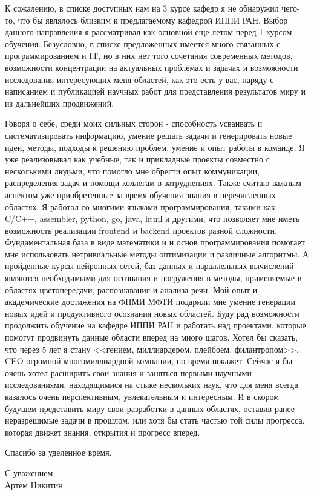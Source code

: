 \quad К сожалению, в списке доступных нам на 3 курсе кафедр я не обнаружил чего-то, что бы являлось близким к предлагаемому кафедрой ИППИ РАН.
Выбор данного направления я рассматривал как основной еще летом перед 1 курсом обучения. Безусловно, в списке предложенных имеется много
связанных с программированием и IT, но в них нет того сочетания современных методов, возможности концентрации на актуальных проблемах и задачах
и возможности исследования интересующих меня областей, как это есть у вас, наряду с написанием и публикацией научных работ для представления
результатов миру и из дальнейших продвижений.

\quad Говоря о себе, среди моих сильных сторон - способность усваивать и систематизировать информацию, умение решать задачи и генерировать
новые идеи, методы, подходы к решению проблем, умение и опыт работы в команде. Я уже реализовывал как учебные, так и прикладные проекты
совместно с несколькими людьми, что помогло мне обрести опыт коммуникации, распределения задач и помощи коллегам в затруднениях. Также считаю
важным аспектом уже приобретенные за время обучения знания в перечисленных областях. Я работал со многими языками программирования, такими как
C/C++, assembler, python, go, java, html и другими, что позволяет мне иметь возможность реализации frontend и backend проектов разной
сложности. Фундаментальная база в виде математики и и основ программирования помогает мне использовать нетривиальные методы оптимизации и
различные алгоритмы. А пройденные курсы нейронных сетей, баз данных и параллельных вычислений являются необходимыми для осознания и погружения
в методы, применяемые в областях цветопередачи, распознавания и анализа речи. Мой опыт и академические достижения на ФПМИ МФТИ подарили мне
умение генерации новых идей и продуктивного осознания новых областей. Буду рад возможности продолжить обучение на кафедре ИППИ РАН и работать
над проектами, которые помогут продвинуть данные области вперед на много шагов. Хотел бы сказать, что через 5 лет я стану <<гением,
миллиардером, плейбоем, филантропом>>, CEO огромной многомиллиардной компании, но время покажет. Сейчас я бы очень хотел расширить свои знания
и заняться первыми научными исследованиями, находящимися на стыке нескольких наук, что для меня всегда казалось очень перспективным,
увлекательным и интересным. И в скором будущем представить миру свои разработки в данных областях, оставив ранее неразрешимые задачи в прошлом,
или хотя бы стать частью той силы прогресса, которая движет знания, открытия и прогресс вперед.

\quad Спасибо за уделенное время.

\begin{flushright}
    С уважением, \\
    Артем Никитин
\end{flushright}
